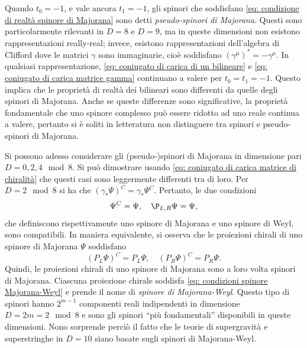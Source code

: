 Quando $t_0 = -1$, e vale ancora $t_1 = -1$, gli spinori che soddisfano \eqref{eq: condizione di realtà spinore di Majorana} sono detti \emph{pseudo-spinori di Majorana}. Questi sono particolarmente rilevanti in $D = 8$ e $D = 9$, ma in queste dimensioni non esistono rappresentazioni really-real; invece, esistono rappresentazioni dell'algebra di Clifford dove le matrici $\gamma$ sono immaginarie, cioè soddisfano $(\gamma^\mu)^* = -\gamma^\mu$. In qualsiasi rappresentazione, \eqref{eq: coniugato di carica di un bilineare} e \eqref{eq: coniugato di carica matrice gamma} continuano a valere per $t_0 = t_1 = -1$. Questo implica che le proprietà di realtà dei bilineari sono differenti da quelle degli spinori di Majorana. Anche se queste differenze sono significative, la proprietà fondamentale che uno spinore complesso può essere ridotto ad uno reale continua a valere, pertanto si è soliti in letteratura non distinguere tra spinori e pseudo-spinori di Majorana. 

Si possono adesso considerare gli (pseudo-)spinori di Majorana in dimensione pari $D = 0,2,4\mod{8}$. Si può dimostrare usando \eqref{eq: coniugato di carica matrice di chiralità} che questi casi sono leggermente differenti tra di loro. Per $D = 2\mod{8}$ si ha che $(\gamma_*\Psi)^C = \gamma_*\Psi^C$. Pertanto, le due condizioni
\begin{equation}
\label{eq: condizioni spinore Majorana-Weyl}
    \Psi^C = \Psi,\quad \P_{L,R}\Psi = \Psi,
\end{equation}
che definiscono rispettivamente uno spinore di Majorana e uno spinore di Weyl, sono compatibili. In maniera equivalente, si osserva che le proiezioni chirali di uno spinore di Majorana $\Psi$ soddisfano 
\begin{equation}
\label{eq: proiezioni chirali spinore di Majorana}
    (P_L\Psi)^C = P_L\Psi,\quad (P_R\Psi)^C = P_R\Psi.
\end{equation}
Quindi, le proiezioni chirali di uno spinore di Majorana sono a loro volta spinori di Majorana. Ciascuna proiezione chirale soddisfa \eqref{eq: condizioni spinore Majorana-Weyl} e prende il nome di \emph{spinore di Majorana-Weyl}. Questo tipo di spinori hanno $2^{m - 1}$ componenti reali indipendenti in dimensione $D = 2m = 2\mod{8}$ e sono gli spinori ``più fondamentali'' disponibili in queste dimensioni. Nono sorprende perciò il fatto che le teorie di supergravità e superstringhe in $D = 10$ siano basate sugli spinori di Majorana-Weyl.

